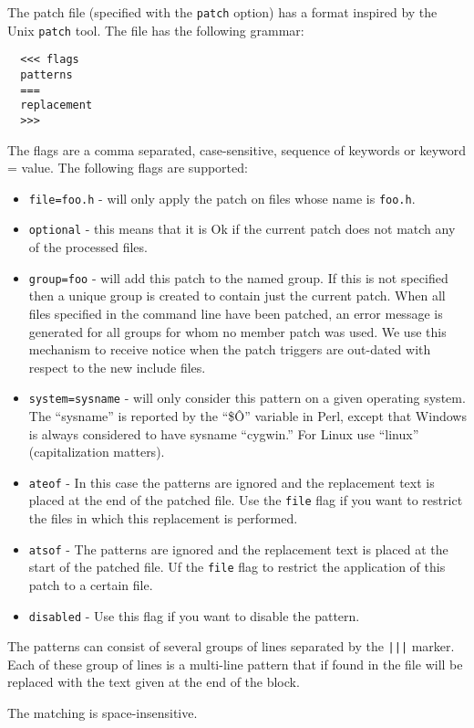 \documentclass[letterpaper]{article}
\def\t#1{{\tt #1}}
\begin{document}
 The patch file (specified with the \t{patch} option) has a format inspired by
the Unix \t{patch} tool. The file has the following grammar:

\begin{verbatim}
  <<< flags
  patterns
  ===
  replacement
  >>>
\end{verbatim}

 The flags are a comma separated, case-sensitive, sequence of keywords or
keyword = value. The following flags are supported:
\begin{itemize}
\item \t{file=foo.h} - will only apply the patch on files whose name is
                       \t{foo.h}. 
\item \t{optional} - this means that it is Ok if the current patch does not
match any of the processed files. 
\item \t{group=foo} - will add this patch to the named group. If this is not
specified then a unique group is created to contain just the current patch.
When all files specified in the command line have been patched, an error
message is generated for all groups for whom no member patch was used. We use
this mechanism to receive notice when the patch triggers are out-dated with
respect to the new include files. 
\item \t{system=sysname} - will only consider this pattern on a given
operating system. The ``sysname'' is reported by the ``\$\^O'' variable in
Perl, except that Windows is always considered to have sysname
``cygwin.'' For Linux use ``linux'' (capitalization matters).
\item \t{ateof} - In this case the patterns are ignored and the replacement
text is placed at the end of the patched file. Use the \t{file} flag if you
want to restrict the files in which this replacement is performed. 
\item \t{atsof} - The patterns are ignored and the replacement text is placed
at the start of the patched file. Uf the \t{file} flag to restrict the
application of this patch to a certain file. 
\item \t{disabled} - Use this flag if you want to disable the pattern.
\end{itemize}


 The patterns can consist of several groups of lines separated by the \t{|||}
marker. Each of these group of lines is a multi-line pattern that if found in
the file will be replaced with the text given at the end of the block. 

 The matching is space-insensitive.
\end{document}
